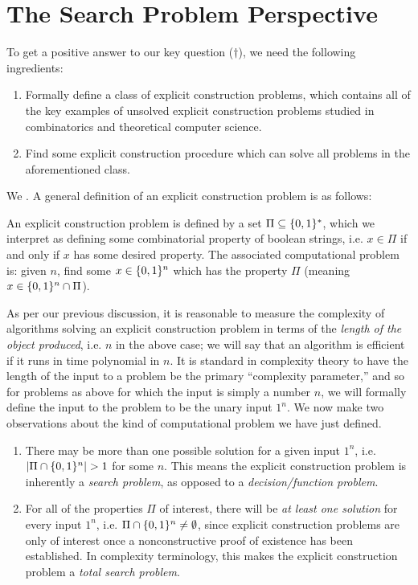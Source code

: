 \section{The Search Problem Perspective}
To get a positive answer to our key question ($\dagger$), we need the following ingredients:
\begin{enumerate}
    \item Formally define a class of explicit construction problems, which contains all of the key examples of unsolved explicit construction problems studied in combinatorics and theoretical computer science.
    \item Find some explicit construction procedure which can solve all problems in the aforementioned class.
\end{enumerate}
We . A general definition of an explicit construction problem is as follows:
\begin{definition*}
An explicit construction problem is defined by a set $\Pi \subseteq \{0,1\}^*$, which we interpret as defining some combinatorial property of boolean strings, i.e. $x \in \Pi$ if and only if $x$ has some desired property. The associated computational problem is: given $n$, find some $x \in \{0,1\}^n$ which has the property $\Pi$ (meaning $x \in \{0,1\}^n \cap \Pi$).
\end{definition*}
As per our previous discussion, it is reasonable to measure the complexity of algorithms solving an explicit construction problem in terms of the \emph{length of the object produced}, i.e. $n$ in the above case; we will say that an algorithm is efficient if it runs in time polynomial in $n$. It is standard in complexity theory to have the length of the input to a problem be the primary ``complexity parameter,'' and so for problems as above for which the input is simply a number $n$, we will formally define the input to the problem to be the unary input $1^n$.
We now make two observations about the kind of computational problem we have just defined. 
\begin{enumerate}
    \item There may be more than one possible solution for a given input $1^n$, i.e. $|\Pi \cap \{0,1\}^n| > 1$ for some $n$. This means the explicit construction problem is inherently a \emph{search problem}, as opposed to a \emph{decision/function problem}.
    \item For all of the properties $\Pi$ of interest, there will be \emph{at least one solution} for every input $1^n$, i.e. $\Pi \cap \{0,1\}^n \neq \emptyset$, since explicit construction problems are only of interest once a nonconstructive proof of existence has been established. In complexity terminology, this makes the explicit construction problem a \emph{total search problem}.
\end{enumerate}
